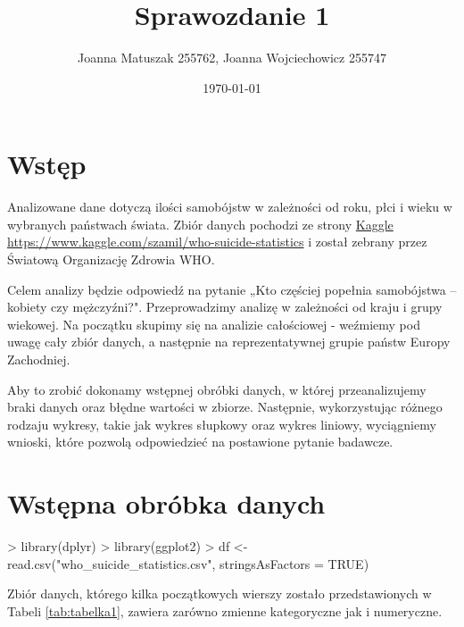 \documentclass[12pt]{mwrep}
\author{Joanna Matuszak 255762, Joanna Wojciechowicz 255747}
\title{Sprawozdanie 1}
\date{\today}
\begin{document}

\maketitle
\tableofcontents
\chapter{Wstęp}

Analizowane dane dotyczą ilości samobójstw w zależności od roku, płci i wieku w wybranych państwach świata. Zbiór danych pochodzi ze strony \href{https://www.kaggle.com/}{Kaggle} \url{https://www.kaggle.com/szamil/who-suicide-statistics} i został zebrany przez Światową Organizację Zdrowia WHO. 

Celem analizy będzie odpowiedź na pytanie „Kto częściej popełnia samobójstwa – kobiety czy mężczyźni?". Przeprowadzimy analizę w zależności od kraju i grupy wiekowej. Na początku skupimy się na analizie całościowej - weźmiemy pod uwagę cały zbiór danych, a następnie na reprezentatywnej grupie państw Europy Zachodniej.

Aby to zrobić dokonamy wstępnej obróbki danych, w której przeanalizujemy braki danych oraz błędne wartości w zbiorze. Następnie, wykorzystując różnego rodzaju wykresy, takie jak wykres słupkowy oraz wykres liniowy, wyciągniemy wnioski, które pozwolą odpowiedzieć na postawione pytanie badawcze.


\chapter{Wstępna obróbka danych}

\begin{Schunk}
\begin{Sinput}
> library(dplyr)
> library(ggplot2)
> df <- read.csv("who_suicide_statistics.csv", stringsAsFactors = TRUE)
\end{Sinput}
\end{Schunk}

Zbiór danych, którego kilka początkowych wierszy zostało przedstawionych w Tabeli \ref{tab:tabelka1}, zawiera zarówno zmienne kategoryczne jak i numeryczne.
\end{document}

